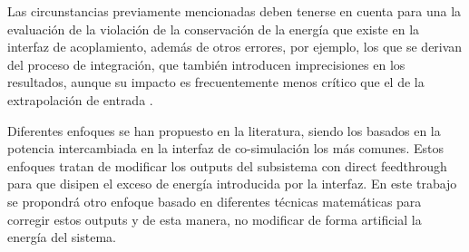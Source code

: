 Las circunstancias previamente mencionadas deben tenerse en cuenta para una la evaluación de la violación de la conservación de la energía que existe en la interfaz de acoplamiento, además de otros errores, por ejemplo, los que se derivan del proceso de integración, que también introducen imprecisiones en los resultados, aunque su impacto es frecuentemente menos crítico que el de la extrapolación de entrada \cite{Chen2021}.

Diferentes enfoques se han propuesto en la literatura, siendo los basados en la potencia intercambiada en la interfaz de co-simulación los más comunes. Estos enfoques tratan de modificar los outputs del subsistema con direct feedthrough para que disipen el exceso de energía introducida por la interfaz. 
En este trabajo se propondrá otro enfoque basado en diferentes técnicas matemáticas para corregir estos outputs y de esta manera, no modificar de forma artificial la energía del sistema.
